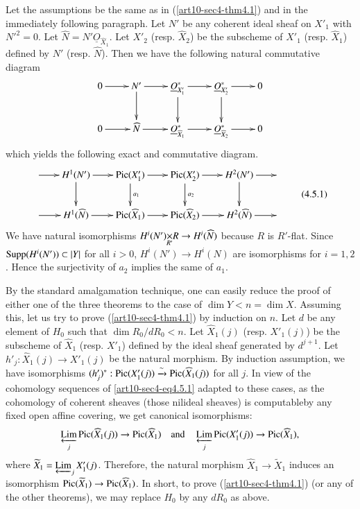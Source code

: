 \begin{remark}\label{art10-sec4-rem4.5}
Let the assumptions be the same as in (\ref{art10-sec4-thm4.1}) and in the immediately following paragraph. Let $N'$ be any coherent ideal sheaf on $X'_{1}$ with ${N'}^{2}=0$. Let $\widehat{N}=N'\underline{O}_{\widehat{X}_{1}}$. Let $X'_{2}$ (resp. $\widehat{X}_{2}$) be the subscheme of $X'_{1}$ (resp. $\widehat{X}_{1}$) defined by $N'$ (resp. $\widehat{N}$). Then we have the following natural commutative diagram
\[
\xymatrix{
0\ar[r] & N'\ar[d] \ar[r] & \underline{O}^{*}_{X'_{1}}\ar[d] \ar[r] & \underline{O}^{*}_{X'_{2}}\ar[d]\ar[r] & 0\\
0\ar[r] & \widehat{N}\ar[r] & \underline{O}^{*}_{\widehat{X}_{1}}\ar[r] & \underline{O}^{*}_{\widehat{X}_{2}}\ar[r] & 0
}
\]
which yields the following exact and commutative diagram.
\begin{equation*}
\vcenter{\xymatrix@C=.72cm{
\ar[r] & H^{1}(N')\ar[d]\ar[r] & \Pic(X'_{1})\ar[d]^-{a_{1}}\ar[r] & \Pic(X'_{2})\ar[d]^-{a_{2}}\ar[r] & H^{2}(N')\ar[d]\ar[r] &\\
\ar[r] & H^{1}(\widehat{N})\ar[r] & \Pic(\widehat{X}_{1})\ar[r] & \Pic(\widehat{X}_{2})\ar[r] & H^{2}(\widehat{N})\ar[r] & 
}}\tag{4.5.1}\label{art10-sec4-eq4.5.1}
\end{equation*}
We have natural isomorphisms $\fprod{H^{i}(N')}{R}{R'}\to H^{i}(\widehat{N})$ because $R$ is $R'$-flat. Since $\operatorname{\mathrm{Supp}} (H^{i}(N'))\subset |Y|$ for all $i>0$, $H^{i}(N')\to H^{i}(N)$ are isomorphisms for $i=1,2$. Hence the surjectivity of $a_{2}$ implies the same of $a_{1}$.
\end{remark}

\begin{remark}\label{art10-sec4-rem4.6}
By the standard amalgamation technique, one can easily reduce the proof of either one of the three theorems to the case of $\dim Y<n=\dim X$. Assuming this, let us try to prove (\ref{art10-sec4-thm4.1}) by induction on $n$. Let $d$ be any element of $H_{0}$ such that $\dim R_{0}/dR_{0}<n$. Let $\widehat{X}_{1}(j)$ (resp. $X'_{1}(j)$) be the subscheme of $\widehat{X}_{1}$ (resp. $X'_{1}$) defined by the ideal sheaf generated by $d^{j+1}$. Let $h'_{j}:\widehat{X}_{1}(j)\to X'_{1}(j)$ be the natural morphism. By induction assumption, we have isomorphisms $(h'_{j})^{*}:\operatorname{\mathrm{Pic}}(X'_{1}(j))\xrightarrow{\sim}\operatorname{\mathrm{Pic}}(\widehat{X}_{1}(j))$ for all $j$. In view of the cohomology sequences of \eqref{art10-sec4-eq4.5.1} adapted to these cases, as the cohomology of coherent sheaves (those nilideal sheaves) is computable\pageoriginale by any fixed open affine covering, we get canonical isomorphisms:
$$
\operatorname*{\underleftarrow{\mathrm{Lim}}}\limits_{j} \operatorname{\mathrm{Pic}}(\widehat{X}_{1}(j))\to \operatorname{\mathrm{Pic}} (\widehat{X}_{1})\quad\text{and}\quad \operatorname*{\underleftarrow{\mathrm{Lim}}}_{j}\operatorname{\mathrm{Pic}} (X'_{1}(j))\to \operatorname{\mathrm{Pic}}(\widehat{X}_{1}),
$$
where $\widetilde{X}_{1}=\operatorname*{\underleftarrow{\mathrm{Lim}}}_{j}X'_{1}(j)$. Therefore, the natural morphism $\widehat{X}_{1}\to \widetilde{X}_{1}$ induces an isomorphism $\operatorname{\mathrm{Pic}} (\widetilde{X}_{1})\to \operatorname{\mathrm{Pic}}(\widehat{X}_{1})$. In short, to prove (\ref{art10-sec4-thm4.1}) (or any of the other theorems), we may replace $H_{0}$ by any $dR_{0}$ as above.
\end{remark}

